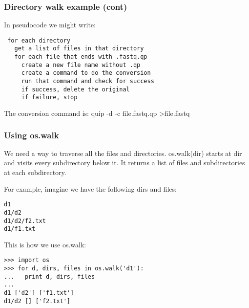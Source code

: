 \documentclass[10pt]{beamer}
\newcommand\smallfont{\fontsize{8pt}{7.2}\selectfont}
\begin{document}
\begin{frame}[fragile]
\frametitle{Directory walk example (cont)}
\smallfont
In pseudocode we might write:
\begin{verbatim}
 for each directory
   get a list of files in that directory
   for each file that ends with .fastq.qp
     create a new file name without .qp
     create a command to do the conversion
     run that command and check for success
     if success, delete the original
     if failure, stop
\end{verbatim}

The conversion command is: quip -d -c file.fastq.qp \textgreater file.fastq 

\end{frame}

\begin{frame}[fragile]
\frametitle{Using os.walk}

We need a way to traverse all the files and directories.
os.walk(dir) starts at dir and visits every subdirectory below it.
It returns a list of files and subdirectories at each subdirectory. 
\vspace{2mm}

For example, imagine we have the following dirs and files:

\smallfont
\begin{verbatim}
d1
d1/d2
d1/d2/f2.txt
d1/f1.txt
\end{verbatim}

This is how we use os.walk:

\smallfont
\begin{verbatim}
>>> import os
>>> for d, dirs, files in os.walk('d1'):
...   print d, dirs, files
... 
d1 ['d2'] ['f1.txt']
d1/d2 [] ['f2.txt']
\end{verbatim}
\end{frame}
\end{document}

